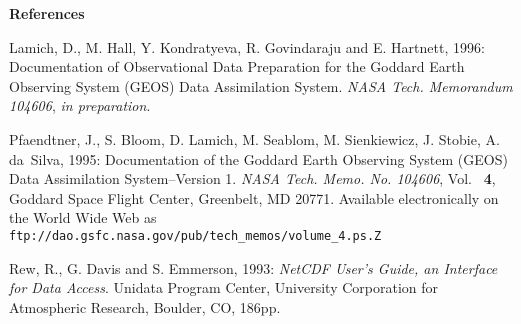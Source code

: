 %
%
% 
\centerline{\huge\bf References}
% 
% 
\begin{description}
\item{}Lamich, D., M. Hall, Y. Kondratyeva, R. Govindaraju and E. Hartnett, 
       1996: Documentation of Observational Data Preparation for the Goddard 
       Earth Observing System (GEOS) Data Assimilation System. 
       {\em NASA Tech. Memorandum 104606}, {\em in preparation}.
 
\item{}Pfaendtner, J., S. Bloom, D. Lamich, M. Seablom, M. Sienkiewicz, 
       J. Stobie, A. da~Silva, 1995: 
       Documentation of the Goddard Earth Observing System (GEOS) Data 
       Assimilation System--Version 1.  
       {\em NASA Tech. Memo. No. 104606}, Vol. ~{\bf 4}, 
       Goddard Space Flight Center, Greenbelt, MD 20771. 
       Available electronically on the World Wide Web as
       {\tt ftp://dao.gsfc.nasa.gov/pub/tech\_memos/volume\_4.ps.Z}
 
\item{}Rew, R., G. Davis and S. Emmerson, 1993: 
       {\em NetCDF User's Guide, an Interface for Data Access}. 
       Unidata Program Center, University Corporation for Atmospheric 
       Research, Boulder, CO, 186pp.
\end{description}
 
